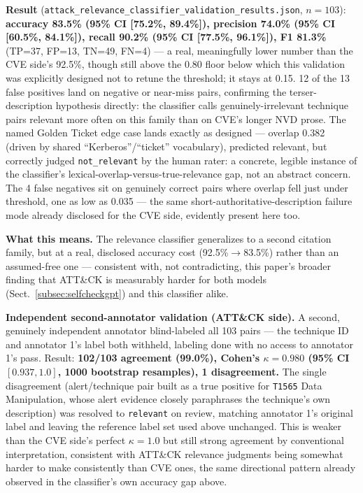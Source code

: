 \documentclass[pdflatex,sn-mathphys-num]{sn-jnl}%
\begin{document}
\textbf{Result} (\texttt{attack\_relevance\_classifier\_validation\_results.json},
$n=103$): \textbf{accuracy 83.5\% (95\% CI [75.2\%, 89.4\%]), precision
74.0\% (95\% CI [60.5\%, 84.1\%]), recall 90.2\% (95\% CI [77.5\%,
96.1\%]), F1 81.3\%} (TP=37, FP=13, TN=49, FN=4) --- a real,
meaningfully lower number than the CVE side's 92.5\%, though still
above the 0.80 floor below which this validation was explicitly
designed not to retune the threshold; it stays at 0.15. 12 of the 13
false positives land on negative or near-miss pairs, confirming the
terser-description hypothesis directly: the classifier calls
genuinely-irrelevant technique pairs relevant more often on this family
than on CVE's longer NVD prose. The named Golden Ticket edge case lands
exactly as designed --- overlap 0.382 (driven by shared
``Kerberos''/``ticket'' vocabulary), predicted relevant, but correctly
judged \texttt{not\_relevant} by the human rater: a concrete, legible
instance of the classifier's lexical-overlap-versus-true-relevance gap,
not an abstract concern. The 4 false negatives sit on genuinely correct
pairs where overlap fell just under threshold, one as low as 0.035 ---
the same short-authoritative-description failure mode already disclosed
for the CVE side, evidently present here too.

\textbf{What this means.} The relevance classifier generalizes to a
second citation family, but at a real, disclosed accuracy cost
(92.5\%$\to$83.5\%) rather than an assumed-free one --- consistent
with, not contradicting, this paper's broader finding that ATT\&CK is
measurably harder for both models (Sect.~\ref{subsec:selfcheckgpt}) and
this classifier alike.

\textbf{Independent second-annotator validation (ATT\&CK side).} A
second, genuinely independent annotator blind-labeled all 103 pairs ---
the technique ID and annotator 1's label both withheld, labeling done
with no access to annotator 1's pass. Result: \textbf{102/103 agreement
(99.0\%), Cohen's $\kappa=0.980$ (95\% CI $[0.937,1.0]$, 1000 bootstrap
resamples), 1 disagreement.} The single disagreement
(alert/technique pair built as a true positive for \texttt{T1565} Data
Manipulation, whose alert evidence closely paraphrases the technique's
own description) was resolved to \texttt{relevant} on review, matching
annotator 1's original label and leaving the reference label set used
above unchanged. This is weaker than the CVE side's perfect
$\kappa=1.0$ but still strong agreement by conventional
interpretation, consistent with ATT\&CK relevance judgments being
somewhat harder to make consistently than CVE ones, the same
directional pattern already observed in the classifier's own accuracy
gap above.
\end{document}
